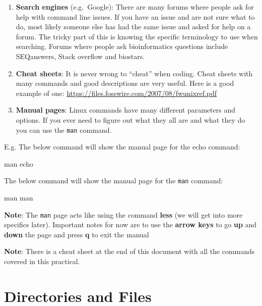 \documentclass[
  letterpaper,
  DIV=11,
  numbers=noendperiod]{scrreprt}
\newenvironment{Shaded}{\begin{snugshade}}{\end{snugshade}}
\newcommand{\FunctionTok}[1]{\textcolor[rgb]{0.28,0.35,0.67}{#1}}
\newcommand{\NormalTok}[1]{\textcolor[rgb]{0.00,0.23,0.31}{#1}}
\providecommand{\tightlist}{%
  \setlength{\itemsep}{0pt}\setlength{\parskip}{0pt}}\usepackage{longtable,booktabs,array}
\begin{document}
\begin{enumerate}
\def\labelenumi{\arabic{enumi}.}
\tightlist
\item
  \textbf{Search engines} (e.g.~Google): There are many forums where
  people ask for help with command line issues. If you have an issue and
  are not sure what to do, most likely someone else has had the same
  issue and asked for help on a forum. The tricky part of this is
  knowing the specific terminology to use when searching. Forums where
  people ask bioinformatics questions include SEQanswers, Stack overflow
  and biostars.
\item
  \textbf{Cheat sheets}: It is never wrong to ``cheat'' when coding.
  Cheat sheets with many commands and good descriptions are very useful.
  Here is a good example of one:
  \url{https://files.fosswire.com/2007/08/fwunixref.pdf}
\item
  \textbf{Manual pages}: Linux commands have many different parameters
  and options. If you ever need to figure out what they all are and what
  they do you can use the \texttt{man} command.
\end{enumerate}

E.g. The below command will show the manual page for the echo command:

\begin{Shaded}
\begin{Highlighting}[]
\FunctionTok{man}\NormalTok{ echo}
\end{Highlighting}
\end{Shaded}

The below command will show the manual page for the \texttt{man}
command:

\begin{Shaded}
\begin{Highlighting}[]
\FunctionTok{man}\NormalTok{ man}
\end{Highlighting}
\end{Shaded}

\textbf{Note}: The \texttt{man} page acts like using the command
\textbf{less} (we will get into more specifics later). Important notes
for now are to use the \textbf{arrow keys} to go \textbf{up} and
\textbf{down} the page and press \textbf{q} to exit the manual

\textbf{Note}: There is a cheat sheet at the end of this document with
all the commands covered in this practical.

\hypertarget{dirsandfiles}{%
\chapter{Directories and Files}\label{dirsandfiles}}
\end{document}
